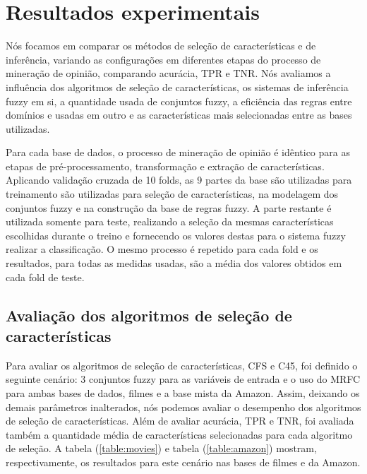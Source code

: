 \documentclass[template.tex]{subfiles}
\begin{document}
\section{Resultados experimentais}

Nós focamos em comparar os métodos de seleção de características e de inferência, variando as configurações em diferentes etapas do processo de mineração de opinião, comparando acurácia, TPR e TNR. Nós avaliamos a influência dos algoritmos de seleção de características, os sistemas de inferência fuzzy em si, a quantidade usada de conjuntos fuzzy, a eficiência das regras entre domínios e usadas em outro e as características mais selecionadas entre as bases utilizadas. 


Para cada base de dados, o processo de mineração de opinião é idêntico para as etapas de pré-processamento, transformação e extração de características. Aplicando validação cruzada de 10 folds, as 9 partes da base são utilizadas para treinamento são utilizadas para seleção de características, na modelagem dos conjuntos fuzzy e na construção da base de regras fuzzy. A parte restante é utilizada somente para teste, realizando a seleção da mesmas características escolhidas durante o treino e fornecendo os valores destas para o sistema fuzzy realizar a classificação. O mesmo processo é repetido para cada fold e os resultados, para todas as medidas usadas, são a média dos valores obtidos em cada fold de teste. 


\subsection{Avaliação dos algoritmos de seleção de características}

Para avaliar os algoritmos de seleção de características, CFS e C45, foi definido o seguinte cenário: 3 conjuntos fuzzy para as variáveis de entrada e o uso do MRFC para ambas bases de dados, filmes e a base mista da Amazon. Assim, deixando os demais parâmetros inalterados, nós podemos avaliar o desempenho dos algoritmos de seleção de características. Além de avaliar acurácia, TPR e TNR, foi avaliada também a quantidade média de características selecionadas para cada algoritmo de seleção. A tabela (\ref{table:movies}) e tabela (\ref{table:amazon}) mostram, respectivamente, os resultados para este cenário nas bases de filmes e da Amazon. 
\end{document}
